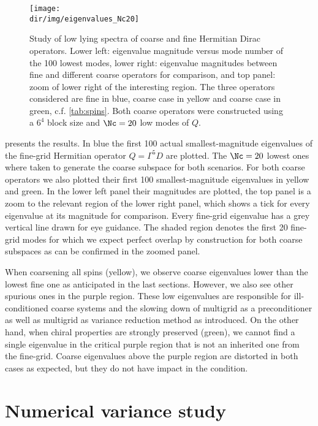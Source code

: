 \begin{figure}
\centering
\texttt{[image: \\dir/img/eigenvalues\_Nc20]}
\caption{
Study of low lying spectra of coarse and fine Hermitian Dirac operators.
Lower left: eigenvalue magnitude versus mode number of the \num{100} lowest modes, lower right: eigenvalue magnitudes between fine and different coarse operators for comparison, and top panel: zoom of lower right of the interesting region.
The three operators considered are fine in blue, coarse case  in yellow and coarse case  in green, c.f. \cref{tab:spins}.
Both coarse operators were constructed using a $6^{4}$ block size and $\Nc=20$ low modes of $Q$.
\takenfull
}
\label{fig:chirality:spectrum}
\end{figure}

 presents the results.
In blue the first \num{100} actual smallest-magnitude eigenvalues of the fine-grid Hermitian operator $Q = \Gamma^5 D$ are plotted.
The $\Nc=20$ lowest ones where taken to generate the coarse subspace for both scenarios.
For both coarse operators we also plotted their first \num{100} smallest-magnitude eigenvalues in yellow and green.
In the lower left panel their magnitudes are plotted, the top panel is a zoom to the relevant region of the lower right panel, which shows a tick for every eigenvalue at its magnitude for comparison.
Every fine-grid eigenvalue has a grey vertical line drawn for eye guidance.
The shaded region denotes the first \num{20} fine-grid modes for which we expect perfect overlap by construction for both coarse subspaces as can be confirmed in the zoomed panel.

When coarsening all spins (yellow), we observe coarse eigenvalues lower than the lowest fine one as anticipated in the last sections.
However, we also see other spurious ones in the purple region.
These low eigenvalues are responsible for ill-conditioned coarse systems and the slowing down of multigrid as a preconditioner as well as multigrid as variance reduction method as introduced.
On the other hand, when chiral properties are strongly preserved (green), we cannot find a single eigenvalue in the critical purple region that is not an inherited one from the fine-grid.
Coarse eigenvalues above the purple region are distorted in both cases as expected, but they do not have impact in the condition.

\section{Numerical variance study}
\label{sec:chirality:variance}

